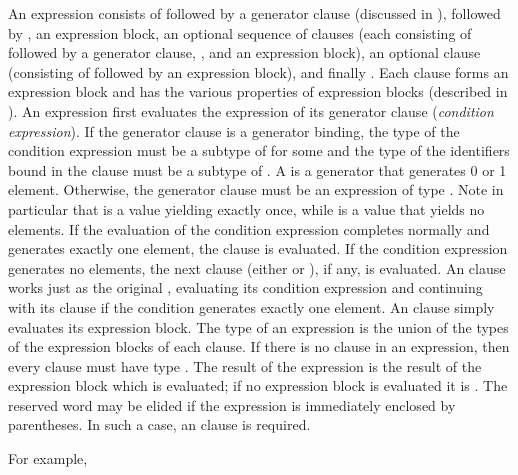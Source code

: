 An  expression consists of  followed by a generator clause
(discussed in ), followed by , an expression block,
an optional sequence of  clauses (each consisting of 
followed by a generator clause, , and an expression block),
an optional  clause (consisting of  followed by
an expression block), and finally .
Each clause forms an expression block and has the various
properties of expression blocks (described in ).
%
An  expression first evaluates the expression of its generator clause
(\emph{condition expression}).
If the generator clause is a generator binding,
the type of the condition expression must be a subtype of
 for some 
and the type of the identifiers bound in the clause must be a subtype of .
A  is a generator that generates 0 or 1 element.
Otherwise, the generator clause must be an expression of type .
Note in particular that  is a  value yielding \EXP{()}
exactly once, while  is a  value that yields no elements.
If the evaluation of the condition expression completes normally and generates
exactly one element, the  clause is evaluated.
If the condition expression generates no elements,
the next clause (either  or ), if any, is evaluated.
An  clause works just as the original ,
evaluating its condition expression and continuing with its  clause
if the condition generates exactly one element.
%
An  clause simply evaluates its expression block.
The type of an  expression is the union of the types of the
expression blocks of each clause.  If there is no  clause in an
 expression, then every clause must have type \EXP{()}.
The result of the  expression is the result of the expression block
which is evaluated; if no expression block is evaluated it is \EXP{()}.
The reserved word  may be elided if the  expression
is immediately enclosed by parentheses.  In such a case, an 
clause is required.

For example,

